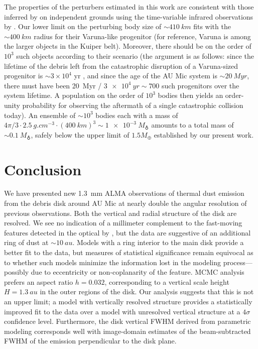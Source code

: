 \documentclass[modern]{aastex62}
\begin{document}
The properties of the perturbers estimated in this work are consistent with those inferred by \citet{chiang&fung17} on independent grounds using the time-variable infrared observations by \citet{boccaletti15,boccaletti18}. 
Our lower limit on the perturbing body size of $\sim \SI{410}{km}$ fits with the $\sim \SI{400}{km}$ radius for their Varuna-like progenitor (for reference, Varuna is among the larger objects in the Kuiper belt). 
Moreover, there should be on the order of $10^3$ such objects according to their scenario (the argument is as follows: since the lifetime of the debris left from the catastrophic disruption of a Varuna-sized progenitor is $\sim$$3 \times 10^4$ yr \citep[][their equation 21]{chiang&fung17}, and since the age of the AU Mic system is $\sim \SI{20}{Myr}$, there must have been \SI{20}{Myr} / $ \SI{3e4}{yr} \sim 700$ such progenitors over the system lifetime. 
A population on the order of $10^3$ bodies then yields an order-unity probability for observing the aftermath of a single catastrophic collision today). 
An ensemble of $\sim 10^3$ bodies each with a mass of $4\pi/3 \cdot \SI{2.5}{g.cm^{-3}} \cdot (\SI{400}{km})^3 \sim \SI{1e-3}{M_\earth}$ amounts to a total mass of $\sim \SI{0.1}{M_\earth}$, safely below the upper limit of $1.5 M_\oplus$ established by our present work.

\section{Conclusion}
\label{section: conclusion}

We have presented new \SI{1.3}{mm} ALMA observations of thermal dust emission from the debris disk around AU Mic at nearly double the angular resolution of previous observations. 
Both the vertical and radial structure of the disk are resolved.
We see no indication of a millimeter complement to the fast-moving features detected in the optical by \citet{boccaletti15}, but the data are suggestive of an additional ring of dust at $\sim \SI{10}{au}$.
Models with a ring interior to the main disk provide a better fit to the data, but measures of statistical significance remain equivocal as to whether such models minimize the information lost in the modeling process---possibly due to eccentricity or non-coplanarity of the feature.
MCMC analysis prefers an aspect ratio $h = 0.032$, corresponding to a vertical scale height $H = \SI{1.3}{au}$ in the outer regions of the disk.
Our analysis suggests that this is not an upper limit; a model with vertically resolved structure provides a statistically improved fit to the data over a model with unresolved vertical structure at a $4 \sigma$ confidence level.
Furthermore, the disk vertical FWHM derived from parametric modeling corresponds well with image-domain estimates of the beam-subtracted FWHM of the emission perpendicular to the disk plane.
\end{document}
